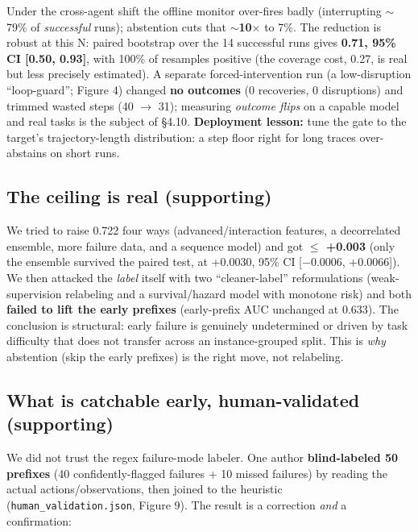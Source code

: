 \begin{center}\small
{}
\end{center}
Under the cross-agent shift the offline monitor over-fires badly (interrupting $\sim$79\% of \emph{successful} runs); abstention cuts that $\sim$\textbf{10$\times$} to 7\%. The reduction is robust at this N: paired bootstrap over the 14 successful runs gives \textbf{0.71, 95\% CI [0.50, 0.93]}, with 100\% of resamples positive (the coverage cost, 0.27, is real but less precisely estimated). A separate forced-intervention run (a low-disruption ``loop-guard''; Figure 4) changed \textbf{no outcomes} (0 recoveries, 0 disruptions) and trimmed wasted steps (40 $\to$ 31); measuring \emph{outcome flips} on a capable model and real tasks is the subject of \S4.10. \textbf{Deployment lesson:} tune the gate to the target's trajectory-length distribution: a step floor right for long traces over-abstains on short runs.

\subsection{The ceiling is real (supporting)}
We tried to raise 0.722 four ways (advanced/interaction features, a decorrelated ensemble, more failure data, and a sequence model) and got \textbf{$\le$ +0.003} (only the ensemble survived the paired test, at +0.0030, 95\% CI [$-$0.0006, +0.0066]). We then attacked the \emph{label} itself with two ``cleaner-label'' reformulations (weak-supervision relabeling and a survival/hazard model with monotone risk) and both \textbf{failed to lift the early prefixes} (early-prefix AUC unchanged at 0.633). The conclusion is structural: early failure is genuinely undetermined or driven by task difficulty that does not transfer across an instance-grouped split. This is \emph{why} abstention (skip the early prefixes) is the right move, not relabeling.

\subsection{What is catchable early, human-validated (supporting)}
We did not trust the regex failure-mode labeler. One author \textbf{blind-labeled 50 prefixes} (40 confidently-flagged failures + 10 missed failures) by reading the actual actions/observations, then joined to the heuristic (\texttt{human\_validation.json}, Figure 9). The result is a correction \emph{and} a confirmation:

